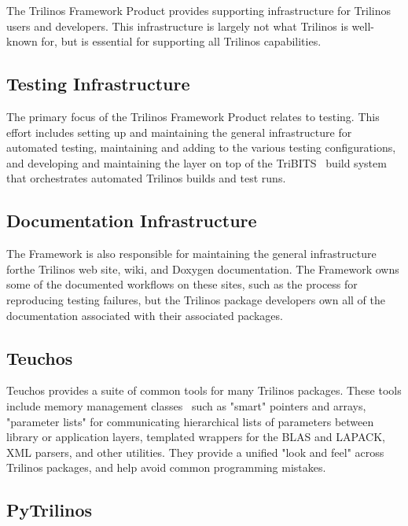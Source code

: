 
The Trilinos Framework Product provides supporting infrastructure for Trilinos users and developers. This infrastructure is largely not what Trilinos is well-known for, but is essential for supporting all Trilinos capabilities.

\subsection{Testing Infrastructure}

The primary focus of the Trilinos Framework Product relates to testing. This effort includes setting up and maintaining the general infrastructure for automated testing, maintaining and adding to the various testing configurations, and developing and maintaining the layer on top of the TriBITS~\cite{Bartlett2014} build system that orchestrates automated Trilinos builds and test runs.

\subsection{Documentation Infrastructure}

The Framework is also responsible for maintaining the general infrastructure forthe Trilinos web site, wiki, and Doxygen documentation. The Framework owns some of the documented workflows on these sites, such as the process for reproducing testing failures, but the Trilinos package developers own all of the documentation associated with their associated packages.

\subsection{Teuchos}

Teuchos provides a suite of common tools for many Trilinos packages. These tools include memory management classes~\cite{bartlett2010} such as "smart" pointers and arrays, "parameter lists" for communicating hierarchical lists of parameters between library or application layers, templated wrappers for the BLAS and LAPACK, XML parsers, and other utilities. They provide a unified "look and feel" across Trilinos packages, and help avoid common programming mistakes.

\subsection{PyTrilinos}

